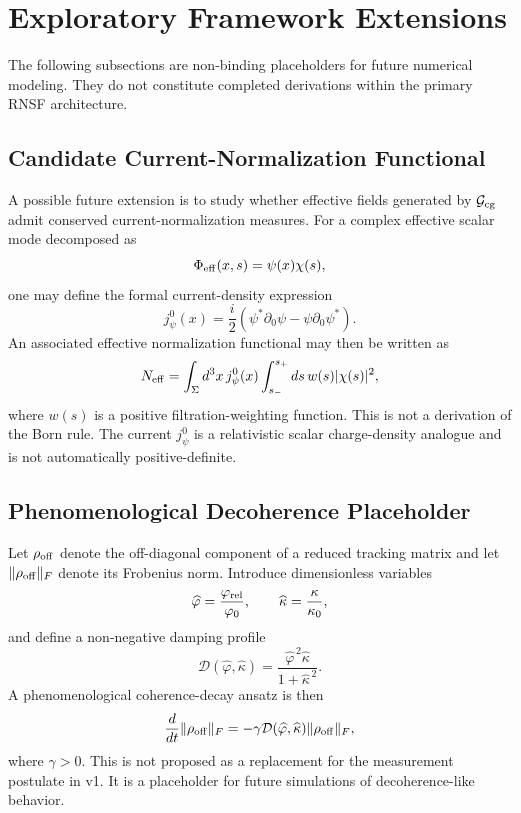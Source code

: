 \documentclass[11pt]{article}
\newcommand{\Gcg}{\mathcal{G}_{\rm cg}}
\begin{document}
\section{Exploratory Framework Extensions}
\label{app:extensions}

The following subsections are non-binding placeholders for future numerical modeling. They do not constitute completed derivations within the primary RNSF architecture.

\subsection{Candidate Current-Normalization Functional}

A possible future extension is to study whether effective fields generated by \(\Gcg\) admit conserved current-normalization measures. For a complex effective scalar mode decomposed as
\begin{equation}
    \Phi_{\rm eff}(x,s)=\psi(x)\chi(s),
\end{equation}
one may define the formal current-density expression
\begin{equation}
    j_\psi^0(x)=\frac{i}{2}\left(\psi^*\partial_0\psi-\psi\partial_0\psi^*\right).
\end{equation}
An associated effective normalization functional may then be written as
\begin{equation}
    N_{\rm eff}=
    \int_\Sigma d^3x\,j_\psi^0(x)
    \int_{s_-}^{s_+}ds\,w(s)|\chi(s)|^2,
\end{equation}
where \(w(s)\) is a positive filtration-weighting function. This is not a derivation of the Born rule. The current \(j_\psi^0\) is a relativistic scalar charge-density analogue and is not automatically positive-definite.

\subsection{Phenomenological Decoherence Placeholder}

Let \(\rho_{\rm off}\) denote the off-diagonal component of a reduced tracking matrix and let \(\|\rho_{\rm off}\|_F\) denote its Frobenius norm. Introduce dimensionless variables
\begin{equation}
    \widehat{\varphi}=\frac{\varphi_{\rm rel}}{\varphi_0},
    \qquad
    \widehat{\kappa}=\frac{\kappa}{\kappa_0},
\end{equation}
and define a non-negative damping profile
\begin{equation}
    \mathcal D(\widehat{\varphi},\widehat{\kappa})=
    \frac{\widehat{\varphi}^{\,2}\widehat{\kappa}}{1+\widehat{\kappa}^{\,2}}.
\end{equation}
A phenomenological coherence-decay ansatz is then
\begin{equation}
    \frac{d}{dt}\|\rho_{\rm off}\|_F
    =
    -\gamma\mathcal D(\widehat{\varphi},\widehat{\kappa})\|\rho_{\rm off}\|_F,
\end{equation}
where \(\gamma>0\). This is not proposed as a replacement for the measurement postulate in v1. It is a placeholder for future simulations of decoherence-like behavior.
\end{document}
